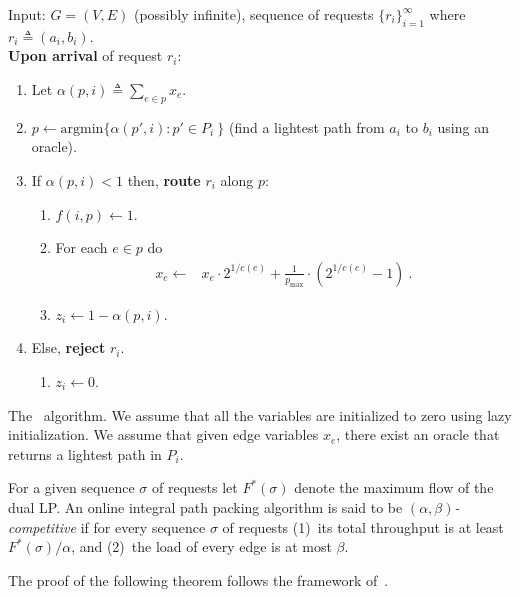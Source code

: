 \documentclass[11pt]{article}
\newcommand{\route}{\text{\sc{ipp}}}
\newcommand{\pmax}{p_{\max}}
\newenvironment{proof sketch}[1]{\noindent {\emph{Proof sketch of #1:}}}{\hfill \qed}
\begin{document}
\begin{algorithm}
    Input: $G=(V,E)$ (possibly infinite), sequence of requests $\{r_i\}_{i=1}^\infty$ where $r_i\triangleq (a_i,b_i)$.
    \\
    \textbf{Upon arrival} of request $r_i$:
        \begin{enumerate}
            \item Let $\alpha(p,i) \triangleq \sum_{e\in p} x_{e}$.
            \item $p \leftarrow \textrm{argmin} \{\alpha(p',i) : p'\in
                  P_i\: \}$ (find a lightest path from $a_i$ to $b_i$ using an oracle).
            \item If $\alpha(p,i) < 1$ then, \textbf{route} $r_i$ along $p$:
            \begin{enumerate}
                    \item $f(i,p) \leftarrow 1$.
                    \item \label{step:xupdate}For each $e\in p$ do
                  \begin{align*}
                        x_{e} \gets&
x_{e} \cdot 2^{1/c(e)}+\frac{1}{\pmax}\cdot (2^{1/c(e)}-1)\:.\end{align*}
                  \item $z_{i} \leftarrow 1 - \alpha(p,i)$.
            \end{enumerate}
            \item Else, \textbf{reject} $r_i$.
            \begin{enumerate}
              \item$z_{i} \leftarrow 0$.
            \end{enumerate}
        \end{enumerate}
\caption{The \route\ algorithm.  We assume that all the
  variables are initialized to zero using lazy initialization. We assume that given edge variables $x_e$, there exist an oracle that returns a lightest path in $P_i$. }
  \label{fig:route}
\end{algorithm}


For a given sequence $\sigma$ of requests let $F^*(\sigma)$
denote the maximum flow of the dual LP.  An online integral
path packing algorithm is said to be
\emph{$(\alpha,\beta)$-competitive} if for every sequence
$\sigma$ of requests (1)~its total throughput is at least
$F^*(\sigma)/\alpha$, and (2)~the load of every edge is at
most $\beta$.


\medskip
\noindent
The proof of the following theorem follows the framework of~\cite{BN09,BNsurvey}.
\end{document}
